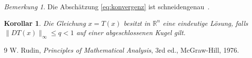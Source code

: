 \documentclass[11pt,reqno]{amsart}
\newtheorem{corollary}[theorem]{Korollar}
\theoremstyle{definition}
\theoremstyle{remark}
\newtheorem{remark}[theorem]{Bemerkung}
\numberwithin{equation}{section}
\begin{document}
\begin{remark}
  Die Abschätzung \cref{eq:konvergenz} ist schneidengenau~\cite{rudin1976}.
\end{remark}

\begin{corollary}
  \label{cor:loesung}
  Die Gleichung $x = T(x)$ besitzt in $\mathbb{R}^n$ eine eindeutige Lösung,
  falls $\|DT(x)\|_\infty \le q < 1$ auf einer abgeschlossenen Kugel gilt.
\end{corollary}

\begin{thebibliography}{9}
   W. Rudin, \emph{Principles of Mathematical Analysis},
  3rd ed., McGraw-Hill, 1976.
\end{thebibliography}
\end{document}
